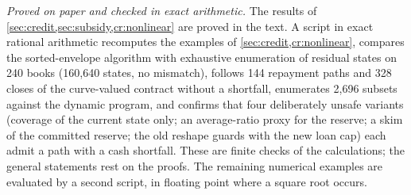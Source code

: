 \emph{Proved on paper and checked in exact arithmetic.} The results of \cref{sec:credit,sec:subsidy,cr:nonlinear} are proved in the text. A script in exact rational arithmetic recomputes the examples of \cref{sec:credit,cr:nonlinear}, compares the sorted-envelope algorithm with exhaustive enumeration of residual states on 240 books (160{,}640 states, no mismatch), follows 144 repayment paths and 328 closes of the curve-valued contract without a shortfall, enumerates 2{,}696 subsets against the dynamic program, and confirms that four deliberately unsafe variants (coverage of the current state only; an average-ratio proxy for the reserve; a skim of the committed reserve; the old reshape guards with the new loan cap) each admit a path with a cash shortfall. These are finite checks of the calculations; the general statements rest on the proofs. The remaining numerical examples are evaluated by a second script, in floating point where a square root occurs.
